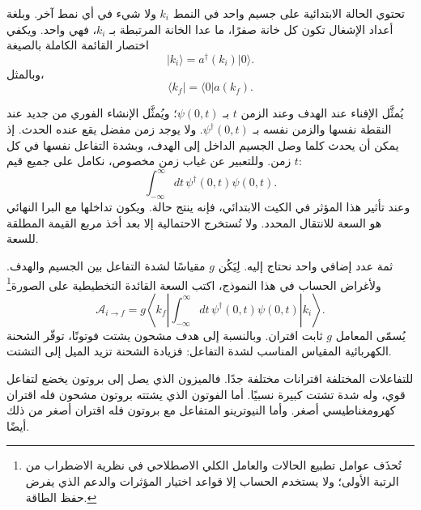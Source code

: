 تحتوي الحالة الابتدائية على جسيم واحد في النمط \(k_i\) ولا شيء في أي نمط آخر. وبلغة أعداد الإشغال تكون كل خانة صفرًا، ما عدا الخانة المرتبطة بـ \(k_i\)، فهي واحد. ويكفي اختصار القائمة الكاملة بالصيغة
\begin{equation}
\lvert k_i\rangle=a^\dagger(k_i)\lvert0\rangle.
\end{equation}
وبالمثل،
\begin{equation}
\langle k_f\rvert=\langle0\rvert a(k_f).
\end{equation}

يُمثَّل الإفناء عند الهدف وعند الزمن \(t\) بـ \(\psi(0,t)\)؛ ويُمثَّل الإنشاء الفوري من جديد عند النقطة نفسها والزمن نفسه بـ \(\psi^\dagger(0,t)\). ولا يوجد زمن مفضل يقع عنده الحدث. إذ يمكن أن يحدث كلما وصل الجسيم الداخل إلى الهدف، وبشدة التفاعل نفسها في كل زمن. وللتعبير عن غياب زمن مخصوص، نكامل على جميع قيم \(t\):
\begin{equation}
\int_{-\infty}^{\infty}dt\,\psi^\dagger(0,t)\psi(0,t).
\end{equation}
وعند تأثير هذا المؤثر في الكيت الابتدائي، فإنه ينتج حالة. ويكون تداخلها مع البرا النهائي هو السعة للانتقال المحدد. ولا تُستخرج الاحتمالية إلا بعد أخذ مربع القيمة المطلقة للسعة.

ثمة عدد إضافي واحد نحتاج إليه. لِيَكُن \(g\) مقياسًا لشدة التفاعل بين الجسيم والهدف. ولأغراض الحساب في هذا النموذج، اكتب السعة القائدة التخطيطية على الصورة\footnote{تُحذَف عوامل تطبيع الحالات والعامل الكلي الاصطلاحي في نظرية الاضطراب من الرتبة الأولى؛ ولا يستخدم الحساب إلا قواعد اختيار المؤثرات والدعم الذي يفرض حفظ الطاقة.}
\begin{equation}
\mathcal A_{i\to f}
=g\left\langle k_f\left|
\int_{-\infty}^{\infty}dt\,
\psi^\dagger(0,t)\psi(0,t)
\right|k_i\right\rangle.
\end{equation}
يُسمّى المعامل \(g\) ثابت اقتران. وبالنسبة إلى هدف مشحون يشتت فوتونًا، توفّر الشحنة الكهربائية المقياس المناسب لشدة التفاعل: فزيادة الشحنة تزيد الميل إلى التشتت.

للتفاعلات المختلفة اقترانات مختلفة جدًا. فالميزون الذي يصل إلى بروتون يخضع لتفاعل قوي، وله شدة تشتت كبيرة نسبيًا. أما الفوتون الذي يشتته بروتون مشحون فله اقتران كهرومغناطيسي أصغر. وأما النيوترينو المتفاعل مع بروتون فله اقتران أصغر من ذلك أيضًا.

\begin{classroomqa}
\end{classroomqa}

